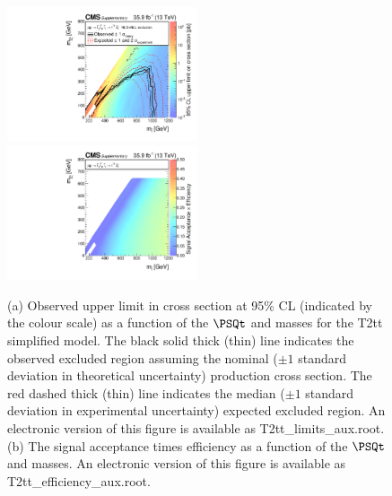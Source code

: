 \begin{figure}
    \begin{center}
            \includegraphics[width=0.50\textwidth]{Supplementary/T2ttXSEC}
            \includegraphics[width=0.50\textwidth]{Supplementary/T2tt_efficiency_aux}
        \caption{ (a) Observed upper limit in cross section at 95\% CL (indicated
        by the colour scale) as a function of 
        the $\PSQt$ and \PSGczDo %
        masses for the 
        T2tt %
        simplified  model.  The  black  solid thick  (thin)  line indicates  the
        observed  excluded  region  assuming   the  nominal  (${\pm}1$  standard
        deviation in theoretical uncertainty)  production cross section. The red
        dashed  thick  (thin)  line  indicates  the  median  (${\pm}1$  standard
        deviation in experimental uncertainty) expected excluded region.
    An electronic version of this figure is available as T2tt\_limits\_aux.root.
        (b) The signal acceptance times efficiency as a function of 
        the $\PSQt$ and \PSGczDo %
        masses.
    An electronic version of this figure is available as T2tt\_efficiency\_aux.root.
        }
        \label{fig:T2tt}
    \end{center}
\end{figure}

